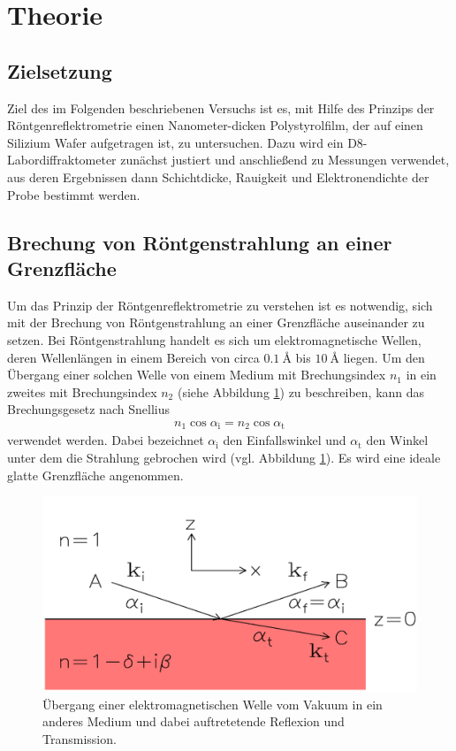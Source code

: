 \section{Theorie}
\label{sec:Theorie}

\subsection{Zielsetzung}
\label{subsec:zielsetzung}
Ziel des im Folgenden beschriebenen Versuchs ist es,
mit Hilfe des Prinzips der Röntgenreflektrometrie
einen Nanometer-dicken Polystyrolfilm, der auf einen Silizium
Wafer aufgetragen ist, zu untersuchen.
Dazu wird ein D8-Labordiffraktometer zunächst justiert und anschließend zu
Messungen verwendet, aus deren Ergebnissen dann Schichtdicke, Rauigkeit und
Elektronendichte der Probe bestimmt werden.


\subsection{Brechung von Röntgenstrahlung an einer Grenzfläche}
\label{subsec:einschicht}
Um das Prinzip der Röntgenreflektrometrie zu verstehen ist es notwendig,
sich mit der Brechung von Röntgenstrahlung an einer Grenzfläche auseinander
zu setzen.
Bei Röntgenstrahlung handelt es sich um elektromagnetische Wellen, deren
Wellenlängen in einem Bereich von circa $\SI{0.1}{\angstrom}$ bis
$\SI{10}{\angstrom}$ liegen.
Um den Übergang einer solchen Welle von einem Medium mit Brechungsindex $n_{1}$
in ein zweites mit Brechungsindex $n_{2}$ (siehe Abbildung \ref{fig:einschicht})
zu beschreiben, kann das Brechungsgesetz nach Snellius
\begin{align}
  n_{1} \cos\alpha_{\text{i}} = n_{2} \cos\alpha_{\text{t}}
  \label{eqn:snellius}
\end{align}
verwendet werden. Dabei bezeichnet $\alpha_{\text{i}}$ den Einfallswinkel
und $\alpha_{\text{t}}$ den Winkel unter dem die Strahlung gebrochen wird
(vgl. Abbildung \ref{fig:einschicht}). Es wird eine ideale glatte Grenzfläche
angenommen. \\

\FloatBarrier
\begin{figure}
  \includegraphics[width=\textwidth]{bilder/einschicht.png}
  \caption{Übergang einer elektromagnetischen Welle vom Vakuum in ein
            anderes Medium und dabei auftretetende Reflexion und Transmission.\cite{sample}}
  \label{fig:einschicht}
\end{figure}
\FloatBarrier

